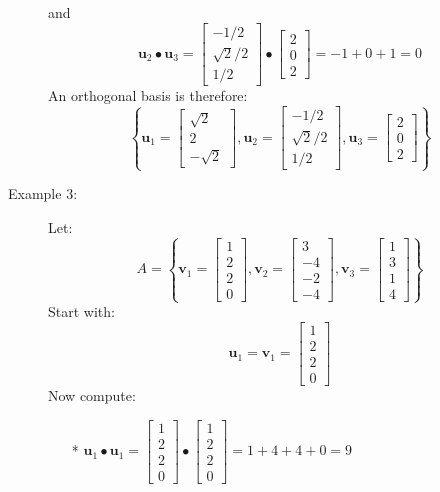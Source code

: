 \documentclass{article}
\begin{document}
\begin{description}
and
\[\mathbf{u}_2 \bullet \mathbf{u}_3 = \begin{bmatrix} -1/2 \\ \sqrt{2}/2 \\ 1/2 \end{bmatrix} \bullet \begin{bmatrix} 2 \\ 0 \\ 2 \end{bmatrix} = -1 + 0 + 1 = 0\]
An orthogonal basis is therefore:
\[\left\{\mathbf{u}_1 = \begin{bmatrix} \sqrt{2} \\ 2 \\ -\sqrt{2} \end{bmatrix}, \mathbf{u}_2 = \begin{bmatrix} -1/2 \\ \sqrt{2}/2 \\ 1/2 \end{bmatrix}, \mathbf{u}_3 = \begin{bmatrix} 2 \\ 0 \\ 2 \end{bmatrix}\right\}\]
\item[Example 3:] Let: 
\[A = \left\{\mathbf{v}_1 = \begin{bmatrix} 1 \\ 2 \\ 2 \\ 0 \end{bmatrix}, \mathbf{v}_2 = \begin{bmatrix} 3 \\ -4 \\ -2 \\ -4 \end{bmatrix}, \mathbf{v}_3 = \begin{bmatrix} 1 \\ 3 \\ 1 \\ 4 \end{bmatrix}\right\}\]
Start with: 
\[\mathbf{u}_1 = \mathbf{v}_1 = \begin{bmatrix} 1 \\ 2 \\ 2 \\ 0 \end{bmatrix}\]
Now compute:
\begin{itemize}
\item[*] \(\mathbf{u}_1 \bullet \mathbf{u}_1 = \begin{bmatrix} 1 \\ 2 \\ 2 \\ 0 \end{bmatrix} \bullet \begin{bmatrix} 1 \\ 2 \\ 2 \\ 0 \end{bmatrix} = 1 + 4 + 4 + 0 = 9\)

\end{itemize}
\end{description}
\end{document}
